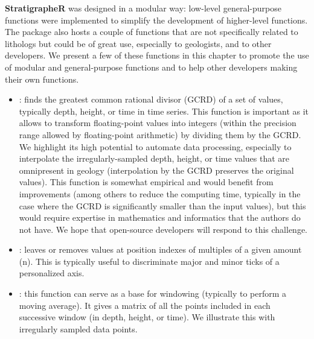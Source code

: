 \textbf{StratigrapheR} was designed in a modular way: low-level general-purpose functions were implemented to simplify the development of higher-level functions. The package also hosts a couple of functions that are not specifically related to lithologs but could be of great use, especially to geologists, and to other developers. We present a few of these functions in this chapter to promote the use of modular and general-purpose functions and to help other developers making their own functions.

\begin{itemize}
	\item {}: finds the greatest common rational divisor (GCRD) of a set of values, typically depth, height, or time in time series. This function is important as it allows to transform floating-point values into integers (within the precision range allowed by floating-point arithmetic) by dividing them by the GCRD. We highlight its high potential to automate data processing, especially to interpolate the irregularly-sampled depth, height, or time values that are omnipresent in geology (interpolation by the GCRD preserves the original values). This function is somewhat empirical and would benefit from improvements (among others to reduce the computing time, typically in the case where the GCRD is significantly smaller than the input values), but this would require expertise in mathematics and informatics that the authors do not have. We hope that open-source developers will respond to this challenge. 
	\item {}: leaves or removes values at position indexes of multiples of a given amount (n). This is typically useful to discriminate major and minor ticks of a personalized axis.
	\item {}: this function can serve as a base for windowing (typically to perform a moving average). It gives a matrix of all the points included in each successive window (in depth, height, or time). We illustrate this with irregularly sampled data points.
	
\end{itemize}

